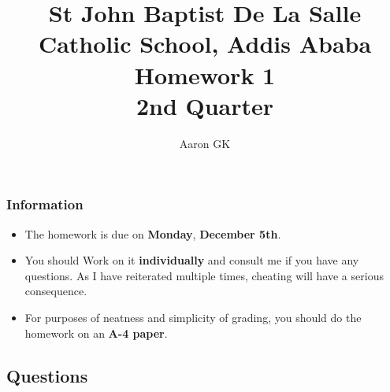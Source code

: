 \documentclass[9pt,addpoints]{exam}
\author{Aaron GK}
\begin{document}
	\title{St John Baptist De La Salle Catholic School, Addis Ababa\\
		\large Homework 1 \\
		2nd Quarter}
	\maketitle
	\begin{center}
		\subsubsection*{Information}
		\begin{itemize}
			\item The homework is due on \textbf{Monday}, \textbf{December 5th}.
			\item You should Work on it \textbf{individually} and consult me if you have any questions. As I have reiterated multiple times, cheating will have a serious consequence.
			\item For purposes of neatness and simplicity of grading, you should do the homework on an \textbf{A-4 paper}.
		\end{itemize}
	\end{center}
	\begin{center}
		\subsection*{Questions}
	\end{center}
	
\end{document}
